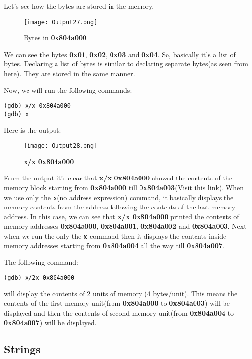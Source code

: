 \documentclass{article}
\begin{document}
Let's see how the bytes are stored in the memory.

\begin{figure}[h]
\centering
\texttt{[image: Output27.png]}
\caption{Bytes in \textbf{0x804a000}}
\label{fig:bytes}
\end{figure}
We can see the bytes \textbf{0x01}, \textbf{0x02}, \textbf{0x03} and \textbf{0x04}. So, basically it's a list of bytes. Declaring a list of bytes is similar to declaring separate bytes(as seen from \href{https://github.com/C0DER11101/NASM/blob/nAsM/Notes/note3.pdf}{here}). They are stored in the same manner.

\vspace{10pt}
Now, we will run the following commands:
\begin{Verbatim}[frame=single]
(gdb) x/x 0x804a000
(gdb) x
\end{Verbatim}

Here is the output:
\begin{figure}[h]
\centering
\texttt{[image: Output28.png]}
\caption{\textbf{x/x} \textbf{0x804a000}}
\label{fig:x/x}
\end{figure}

From the output it's clear that \textbf{x/x 0x804a000} showed the contents of the memory block starting from \textbf{0x804a000} till \textbf{0x804a003}(Visit this \href{https://visualgdb.com/gdbreference/commands/x}{link}).
\newpage
When we use only the \textbf{x}(no address expression) command, it basically displays the memory contents from the address following the contents of the last memory address. In this case, we can see that \textbf{x/x 0x804a000} printed the contents of memory addresses \textbf{0x804a000}, \textbf{0x804a001}, \textbf{0x804a002} and \textbf{0x804a003}. Next when we run the only the \textbf{x} command then it displays the contents inside memory addresses starting from \textbf{0x804a004} all the way till \textbf{0x804a007}.

The following command:
\begin{Verbatim}[frame=single]
(gdb) x/2x 0x804a000
\end{Verbatim}
will display the contents of $2$ units of memory ($4$ bytes/unit). This means the contents of the first memory unit(from \textbf{0x804a000} to \textbf{0x804a003}) will be displayed and then the contents of second memory unit(from \textbf{0x804a004} to \textbf{0x804a007}) will be displayed.
\newpage
\subsection{Strings}\label{sec:strings}
\end{document}

